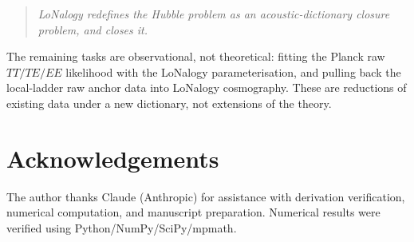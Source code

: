 \documentclass[12pt]{article}
\theoremstyle{plain}
\theoremstyle{definition}
\numberwithin{equation}{section}
\begin{document}
\begin{quote}
\emph{LoNalogy redefines the Hubble problem as an acoustic-dictionary closure
problem, and closes it.}
\end{quote}

The remaining tasks are observational, not theoretical: fitting the Planck raw
$TT/TE/EE$ likelihood with the LoNalogy parameterisation, and pulling back
the local-ladder raw anchor data into LoNalogy cosmography.  These are
reductions of existing data under a new dictionary, not extensions of the theory.


\section*{Acknowledgements}

The author thanks Claude (Anthropic) for assistance with derivation
verification, numerical computation, and manuscript preparation.
Numerical results were verified using Python/NumPy/SciPy/mpmath.
\end{document}
